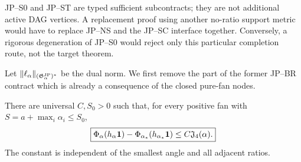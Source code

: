 \begin{remark}
JP--S0 and JP--ST are typed sufficient subcontracts; they are not
additional active DAG vertices.  A replacement proof using another
no-ratio support metric would have to replace JP--NS and the JP--SC
interface together.  Conversely, a rigorous degeneration of JP--S0 would
reject only this particular completion route, not the target theorem.
\end{remark}

Let $\|\ell_\alpha\|_{(\mathfrak G^{\rm JP}_\alpha)^*}$ be the dual norm.  We first remove
the part of the former JP--BR contract which is already a consequence of
the closed pure-fan nodes.

\begin{theorem}
\label{JP:thm:BU}
There are universal $C,S_0>0$ such that, for every positive fan with
$S=a+\max_i\alpha_i\le S_0$,
\begin{equation}\label{JP:eq:fan-upper}
 \boxed{
 \Phi_\alpha(h_\alpha\mathbf1)
       -\Phi_{\alpha_*}(h_{\alpha_*}\mathbf1)
 \le C\mathfrak J_4(\alpha).}
\end{equation}
The constant is independent of the smallest angle and all adjacent ratios.
\end{theorem}

